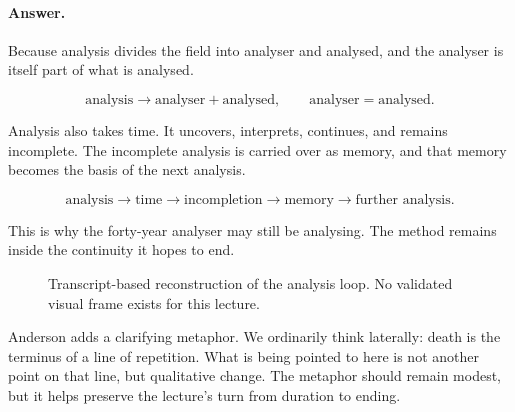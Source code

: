 \documentclass[11pt,oneside]{book}
\begin{document}
\paragraph{Answer.}
Because analysis divides the field into analyser and analysed, and the analyser is itself part of what is analysed.

\begin{equation}
\text{analysis}
\longrightarrow
\text{analyser}+\text{analysed},
\qquad
\text{analyser}=\text{analysed}.
\end{equation}

Analysis also takes time. It uncovers, interprets, continues, and remains incomplete. The incomplete analysis is carried over as memory, and that memory becomes the basis of the next analysis.

\begin{equation}
\text{analysis}
\longrightarrow
\text{time}
\longrightarrow
\text{incompletion}
\longrightarrow
\text{memory}
\longrightarrow
\text{further analysis}.
\end{equation}

This is why the forty-year analyser may still be analysing. The method remains inside the continuity it hopes to end.

\begin{figure}
\centering
{}

Transcript-based reconstruction of the analysis loop. No validated visual frame exists for this lecture.
\end{figure}

Anderson adds a clarifying metaphor. We ordinarily think laterally: death is the terminus of a line of repetition. What is being pointed to here is not another point on that line, but qualitative change. The metaphor should remain modest, but it helps preserve the lecture's turn from duration to ending.
\end{document}
